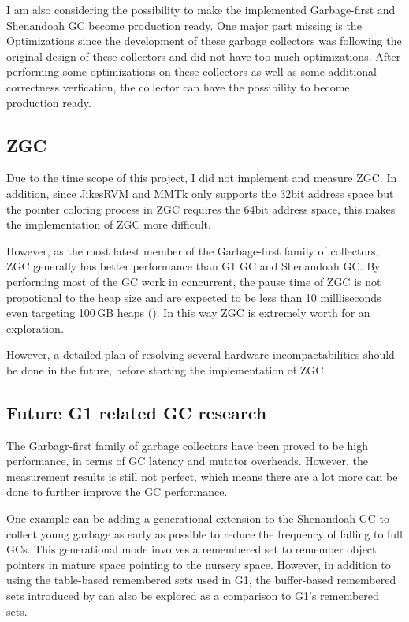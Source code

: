 I am also considering the possibility to make the implemented Garbage-first
and Shenandoah GC become production ready. One major part missing is the Optimizations
since the development of these garbage collectors was following the original design
of these collectors and did not have too much optimizations. After performing some
optimizations on these collectors as well as some additional correctness verfication,
the collector can have the possibility to become production ready.

\subsection{ZGC}

Due to the time scope of this project, I did not implement and measure ZGC.
In addition, since JikesRVM and MMTk only supports the 32bit address space but the pointer
coloring process in ZGC requires the 64bit address space, this makes the implementation
of ZGC more difficult.

However, as the most latest member of the Garbage-first family of collectors, ZGC
generally has better performance than G1 GC and Shenandoah GC. By performing most of the
GC work in concurrent, the pause time of ZGC is not propotional to the heap size and
are expected to be less than 10 millliseconds even targeting 100\,GB heaps (\cite{liden_karlsson_2018}).
In this way ZGC is extremely worth for an exploration.

However, a detailed plan of resolving several hardware incompactabilities should be done in the future,
before starting the implementation of ZGC.

\subsection{Future G1 related GC research}

The Garbagr-first family of garbage collectors have been proved to be high performance,
in terms of GC latency and mutator overheads. However, the measurement results is still
not perfect, which means there are a lot more can be done to further improve the
GC performance.

One example can be adding a generational extension to the Shenandoah GC to collect
young garbage as early as possible to reduce the frequency of falling to full GCs.
This generational mode involves a remembered set to remember object pointers in mature
space pointing to the nursery space. However, in addition to using the table-based remembered
sets used in G1, the buffer-based remembered sets introduced by \cite{blackburn2008immix} can
also be explored as a comparison to G1's remembered sets.

